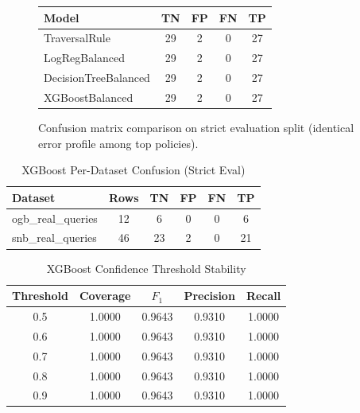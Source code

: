 \documentclass[conference]{IEEEtran}
\begin{document}
\begin{figure}[h]
\centering
\begin{minipage}{0.98\columnwidth}
\centering
\begin{tabular}{lcccc}
\toprule
Model & TN & FP & FN & TP \\
\midrule
TraversalRule & 29 & 2 & 0 & 27 \\
LogRegBalanced & 29 & 2 & 0 & 27 \\
DecisionTreeBalanced & 29 & 2 & 0 & 27 \\
XGBoostBalanced & 29 & 2 & 0 & 27 \\
\bottomrule
\end{tabular}
\end{minipage}
\caption{Confusion matrix comparison on strict evaluation split (identical error profile among top policies).}
\label{fig:confusion_compact}
\end{figure}

\begin{table}[h]
\centering
\caption{XGBoost Per-Dataset Confusion (Strict Eval)}
\label{tab:per_dataset_confusion}
\begin{tabular}{lccccc}
\toprule
Dataset & Rows & TN & FP & FN & TP \\
\midrule
ogb\_real\_queries & 12 & 6 & 0 & 0 & 6 \\
snb\_real\_queries & 46 & 23 & 2 & 0 & 21 \\
\bottomrule
\end{tabular}
\end{table}

\begin{table}[h]
\centering
\caption{XGBoost Confidence Threshold Stability}
\label{tab:threshold_stability}
\begin{tabular}{ccccc}
\toprule
Threshold & Coverage & $F_1$ & Precision & Recall \\
\midrule
0.5 & 1.0000 & 0.9643 & 0.9310 & 1.0000 \\
0.6 & 1.0000 & 0.9643 & 0.9310 & 1.0000 \\
0.7 & 1.0000 & 0.9643 & 0.9310 & 1.0000 \\
0.8 & 1.0000 & 0.9643 & 0.9310 & 1.0000 \\
0.9 & 1.0000 & 0.9643 & 0.9310 & 1.0000 \\
\bottomrule
\end{tabular}
\end{table}
\end{document}
